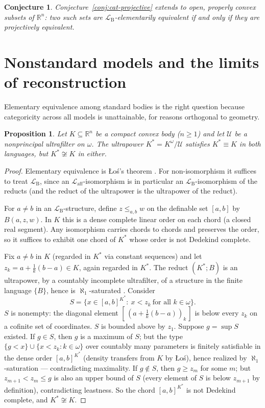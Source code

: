 \documentclass[11pt]{amsart}
\newtheorem{proposition}[theorem]{Proposition}
\newtheorem{conjecture}[theorem]{Conjecture}
\theoremstyle{definition}
\newcommand{\R}{\mathbb{R}}
\newcommand{\Laff}{\mathcal{L}_{\mathrm{aff}}}
\newcommand{\LB}{\mathcal{L}_{\mathrm{B}}}
\begin{document}
\begin{conjecture}\label{conj:noncompact}
Conjecture~\ref{conj:cat-projective} extends to open, properly convex
subsets of $\R^n$: two such sets are $\LB$-elementarily equivalent if and
only if they are projectively equivalent.
\end{conjecture}

\section{Nonstandard models and the limits of reconstruction}
\label{sec:nonstandard}

Elementary equivalence among standard bodies is the right question because
categoricity across all models is unattainable, for reasons orthogonal to
geometry.

\begin{proposition}\label{prop:ultrapower}
Let $K\subseteq\R^n$ be a compact convex body ($n\ge1$) and let
$\mathcal U$ be a nonprincipal ultrafilter on $\omega$. The ultrapower
$K^*=K^\omega/\mathcal U$ satisfies $K^*\equiv K$ in both languages, but
$K^*\not\cong K$ in either.
\end{proposition}

\begin{proof}
Elementary equivalence is \L o\'s's theorem \cite{ChangKeisler90}. For
non-isomorphism it suffices to treat $\LB$, since an $\Laff$-isomorphism is
in particular an $\LB$-isomorphism of the reducts (and the reduct of the
ultrapower is the ultrapower of the reduct).

For $a\ne b$ in an $\LB$-structure, define $z\le_{a,b}w$ on the definable
set $[a,b]$ by $B(a,z,w)$. In $K$ this is a dense complete linear order on
each chord (a closed real segment). Any isomorphism carries chords to chords
and preserves the order, so it suffices to exhibit one chord of $K^*$ whose
order is not Dedekind complete.

Fix $a\ne b$ in $K$ (regarded in $K^*$ via constant sequences) and let
$z_k=a+\tfrac1k(b-a)\in K$, again regarded in $K^*$. The reduct
$(K^*;B)$ is an ultrapower, by a countably incomplete ultrafilter, of a
structure in the finite language $\{B\}$, hence is
$\aleph_1$-saturated \cite[Theorem~6.1.1]{ChangKeisler90}. Consider
\[
S=\{x\in[a,b]^{K^*}:\ x<z_k\ \text{for all }k\in\omega\}.
\]
$S$ is nonempty: the diagonal element $[\,(a+\tfrac1k(b-a))_k\,]$ is below
every $z_k$ on a cofinite set of coordinates. $S$ is bounded above by
$z_1$. Suppose $g=\sup S$ existed. If $g\in S$, then $g$ is a maximum of
$S$; but the type $\{g<x\}\cup\{x<z_k:k\in\omega\}$ over countably many
parameters is finitely satisfiable in the dense order $[a,b]^{K^*}$
(density transfers from $K$ by \L o\'s), hence realized by
$\aleph_1$-saturation --- contradicting maximality. If $g\notin S$, then
$g\ge z_m$ for some $m$; but $z_{m+1}<z_m\le g$ is also an upper bound of
$S$ (every element of $S$ is below $z_{m+1}$ by definition), contradicting
leastness. So the chord $[a,b]^{K^*}$ is not Dedekind complete, and
$K^*\not\cong K$.
\end{proof}
\end{document}
